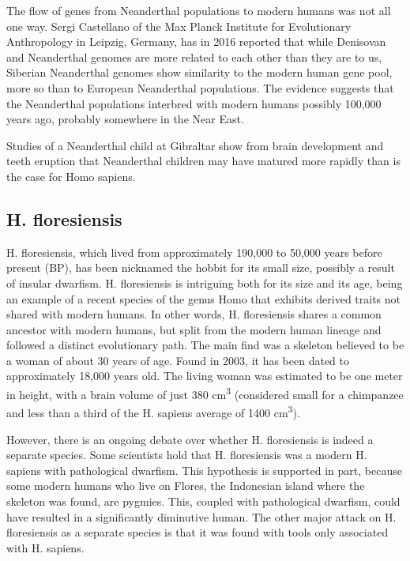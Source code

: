 The flow of genes from Neanderthal populations to modern humans was not all one way. Sergi Castellano of the Max Planck Institute for Evolutionary Anthropology in Leipzig, Germany, has in 2016 reported that while Denisovan and Neanderthal genomes are more related to each other than they are to us, Siberian Neanderthal genomes show similarity to the modern human gene pool, more so than to European Neanderthal populations. The evidence suggests that the Neanderthal populations interbred with modern humans possibly 100,000 years ago, probably somewhere in the Near East.

Studies of a Neanderthal child at Gibraltar show from brain development and teeth eruption that Neanderthal children may have matured more rapidly than is the case for Homo sapiens.

\hypertarget{h.-floresiensis}{%
\subsection{H. floresiensis}\label{h.-floresiensis}}

H. floresiensis, which lived from approximately 190,000 to 50,000 years before present (BP), has been nicknamed the hobbit for its small size, possibly a result of insular dwarfism. H. floresiensis is intriguing both for its size and its age, being an example of a recent species of the genus Homo that exhibits derived traits not shared with modern humans. In other words, H. floresiensis shares a common ancestor with modern humans, but split from the modern human lineage and followed a distinct evolutionary path. The main find was a skeleton believed to be a woman of about 30 years of age. Found in 2003, it has been dated to approximately 18,000 years old. The living woman was estimated to be one meter in height, with a brain volume of just 380 cm\textsuperscript{3} (considered small for a chimpanzee and less than a third of the H. sapiens average of 1400 cm\textsuperscript{3}).

However, there is an ongoing debate over whether H. floresiensis is indeed a separate species. Some scientists hold that H. floresiensis was a modern H. sapiens with pathological dwarfism. This hypothesis is supported in part, because some modern humans who live on Flores, the Indonesian island where the skeleton was found, are pygmies. This, coupled with pathological dwarfism, could have resulted in a significantly diminutive human. The other major attack on H. floresiensis as a separate species is that it was found with tools only associated with H. sapiens.

